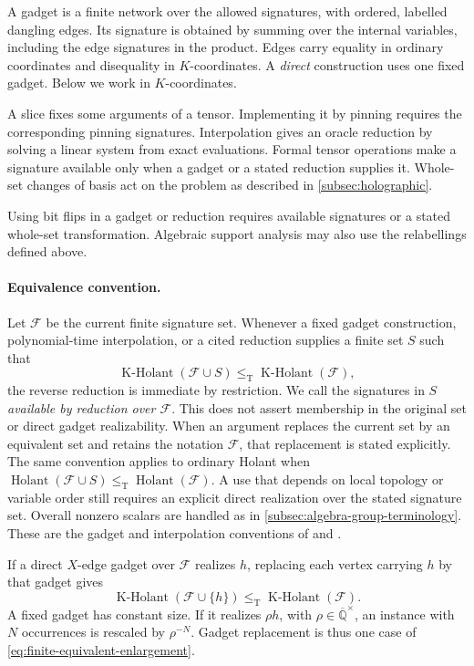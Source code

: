 \documentclass[11pt,letterpaper,onecolumn]{article}
\theoremstyle{plain}
\theoremstyle{definition}
\theoremstyle{remark}
\newcommand{\AlgNums}{\overline{\mathbb Q}}
\newcommand{\cF}{\mathcal F}
\newcommand{\Holant}{\operatorname{Holant}}
\newcommand{\KHolant}{\operatorname{K\text{-}Holant}}
\newcommand{\leT}{\leq_{\mathrm T}}
\begin{document}
A gadget is a finite network over the allowed signatures, with ordered,
labelled dangling edges.  Its signature is obtained by summing over the
internal variables, including the edge signatures in the product.  Edges
carry equality in ordinary coordinates and disequality in \(K\)-coordinates.
A \emph{direct} construction uses one fixed gadget.  Below we work
in \(K\)-coordinates.

A slice fixes some arguments of a tensor. Implementing it by pinning
requires the corresponding pinning signatures. Interpolation gives an
oracle reduction by solving a linear system from exact evaluations.
Formal tensor operations make a signature available only when a gadget or
a stated reduction supplies it. Whole-set changes of basis act on the
problem as described in \cref{subsec:holographic}.

Using bit flips in a gadget or reduction requires available signatures or
a stated whole-set transformation. Algebraic support analysis may also
use the relabellings defined above.

\paragraph{Equivalence convention.}
Let \(\cF\) be the current finite signature set.  Whenever a fixed
gadget construction, polynomial-time interpolation, or a cited reduction
supplies a finite set \(S\) such that
\begin{equation}
\KHolant(\cF\cup S)\leT\KHolant(\cF),
\label{eq:finite-equivalent-enlargement}
\end{equation}
the reverse reduction is immediate by restriction.  We call the signatures
in \(S\) \emph{available by reduction over \(\cF\)}.  This does not assert
membership in the original set or direct gadget realizability.
When an argument replaces the current set by an equivalent set and retains
the notation \(\cF\), that replacement is stated explicitly.
The same convention applies to ordinary Holant when
\(\Holant(\cF\cup S)\leT\Holant(\cF)\).
A use that depends on local topology or variable order still requires an
explicit direct realization over the stated signature set.  Overall nonzero
scalars are handled as in \cref{subsec:algebra-group-terminology}.
These are the gadget and interpolation conventions of
\cite[Section~2.5]{Liu2026DEQ2Holant} and
\cite[Section~2.3]{MengWangXiaZheng2025}.

If a direct \(X\)-edge gadget over \(\cF\) realizes \(h\), replacing
each vertex carrying \(h\) by that gadget gives
\begin{equation}
\KHolant(\cF\cup\{h\})\leT\KHolant(\cF).
\label{eq:direct-gadget-reduction}
\end{equation}
A fixed gadget has constant size.  If it realizes \(\rho h\), with
\(\rho\in\AlgNums^\times\), an instance with \(N\) occurrences is
rescaled by \(\rho^{-N}\).  Gadget replacement is thus one case
of \cref{eq:finite-equivalent-enlargement}.
\end{document}
